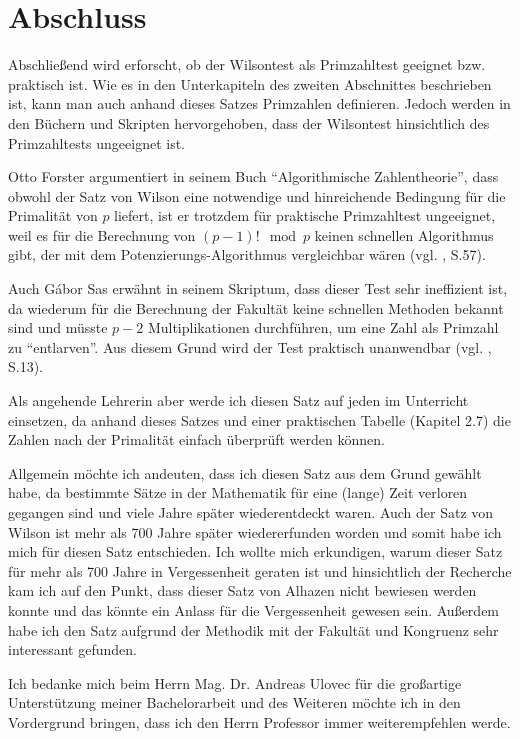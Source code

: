 %
%
\chapter{Abschluss}

Abschließend wird erforscht, ob der Wilsontest als
Primzahltest geeignet bzw. praktisch ist.
Wie es in den Unterkapiteln des zweiten Abschnittes
beschrieben ist, kann man auch anhand
dieses Satzes Primzahlen definieren. Jedoch werden in
den Büchern und Skripten hervorgehoben, dass der
Wilsontest hinsichtlich des Primzahltests ungeeignet ist.

Otto Forster argumentiert in seinem Buch
``Algorithmische Zahlentheorie'', dass obwohl der Satz
von Wilson eine notwendige und hinreichende Bedingung
für die Primalität von $p$ liefert, ist er trotzdem
für praktische Primzahltest ungeeignet, weil es für die
Berechnung von $(p-1)! \mod p$ keinen schnellen
Algorithmus gibt, der mit dem Potenzierungs-Algorithmus
vergleichbar wären (vgl. \cite{forster}, S.57).

Auch Gábor Sas erwähnt in seinem Skriptum, dass dieser
Test sehr ineffizient ist, da wiederum für die Berechnung
der Fakultät keine schnellen Methoden bekannt sind
und müsste $p-2$ Multiplikationen durchführen, um eine
Zahl als Primzahl zu ``entlarven''. Aus diesem Grund
wird der Test praktisch unanwendbar
(vgl. \cite{sasgabor}, S.13).

Als angehende Lehrerin aber werde ich diesen Satz auf
jeden im Unterricht einsetzen, da anhand dieses Satzes
und einer praktischen Tabelle (Kapitel 2.7) die Zahlen
nach der Primalität einfach überprüft werden können.

Allgemein möchte ich andeuten, dass ich diesen Satz
aus dem Grund gewählt habe, da bestimmte Sätze in der
Mathematik für eine (lange) Zeit verloren gegangen
sind und viele Jahre später wiederentdeckt waren.
Auch der Satz von Wilson ist mehr als 700 Jahre später
wiedererfunden worden und somit habe ich mich für
diesen Satz entschieden. Ich wollte mich erkundigen,
warum dieser Satz für mehr als 700 Jahre in Vergessenheit
geraten ist und hinsichtlich der Recherche kam ich auf
den Punkt, dass dieser Satz von Alhazen nicht bewiesen
werden konnte und das könnte ein Anlass für die
Vergessenheit gewesen sein. Außerdem habe ich den Satz
aufgrund der Methodik mit der Fakultät und Kongruenz
sehr interessant gefunden.

Ich bedanke mich beim Herrn Mag. Dr. Andreas Ulovec
für die großartige Unterstützung meiner Bachelorarbeit
und des Weiteren möchte ich in den Vordergrund bringen,
dass ich den Herrn Professor immer weiterempfehlen werde.
